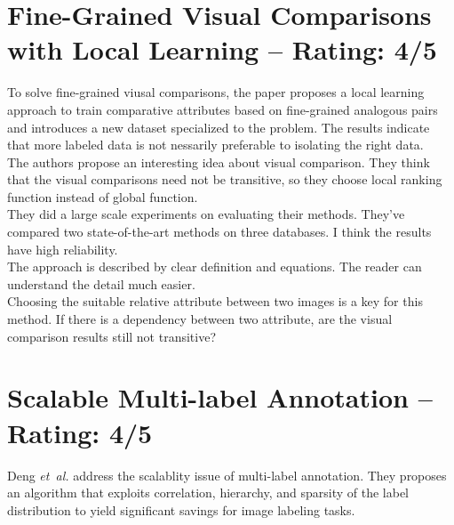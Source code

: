 \documentclass[a4paper]{article}
\begin{document}
\section{Fine-Grained Visual Comparisons with Local Learning -- Rating: 4/5}
To solve fine-grained viusal comparisons, the paper \cite{fine-grained} proposes a local learning approach to train comparative attributes based on fine-grained analogous pairs and introduces a new dataset specialized to the problem. The results indicate that more labeled data is not nessarily preferable to isolating the right data. \\

The authors propose an interesting idea about visual comparison. They think that the visual comparisons need not be transitive, so they choose local ranking function instead of global function. \\

They did a large scale experiments on evaluating their methods. They've compared two state-of-the-art methods on three databases. I think the results have high reliability. \\

The approach is described by clear definition and equations. The reader can understand the detail much easier. \\

Choosing the suitable relative attribute between two images is a key for this method. If there is a dependency between two attribute, are the visual comparison results still not transitive?

\section{Scalable Multi-label Annotation -- Rating: 4/5}
Deng \emph{et~al.} \cite{Deng2014} address the scalablity issue of multi-label annotation. They proposes an algorithm that exploits correlation, hierarchy, and sparsity of the label distribution to yield significant savings for image labeling tasks.\\
\end{document}
